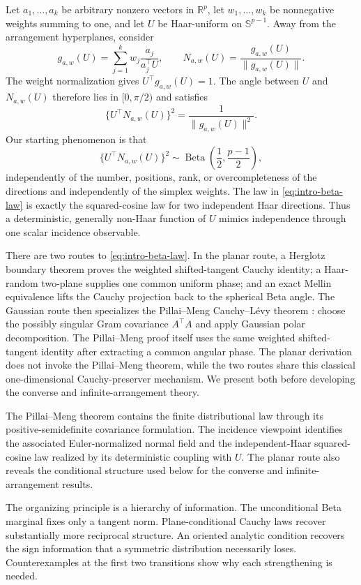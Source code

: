 \documentclass[11pt]{article}
\numberwithin{equation}{section}
\theoremstyle{thmstyleone}%
\theoremstyle{thmstyletwo}%
\let\cref\autoref
\newcommand{\R}{\mathbb R}
\newcommand{\sphere}{\mathbb S}
\newcommand{\Beta}{\operatorname{Beta}}
\begin{document}
Let \(a_1,\ldots,a_k\) be arbitrary nonzero vectors in \(\R^p\), let
\(w_1,\ldots,w_k\) be nonnegative weights summing to one, and let
\(U\) be Haar-uniform on \(\sphere^{p-1}\).  Away from the arrangement
hyperplanes, consider
\[
  g_{a,w}(U)=\sum_{j=1}^k w_j\frac{a_j}{a_j^\top U},
  \qquad
  N_{a,w}(U)=\frac{g_{a,w}(U)}{\|g_{a,w}(U)\|}.
\]
The weight normalization gives \(U^\top g_{a,w}(U)=1\).  The angle between \(U\)
and \(N_{a,w}(U)\) therefore lies in \([0,\pi/2)\) and satisfies
\[
  \{U^\top N_{a,w}(U)\}^2=\frac{1}{\|g_{a,w}(U)\|^2}.
\]
Our starting phenomenon is that
\begin{equation}
  \{U^\top N_{a,w}(U)\}^2
  \sim
  \Beta\!\left(\frac12,\frac{p-1}{2}\right),
  \label{eq:intro-beta-law}
\end{equation}
independently of the number, positions, rank, or overcompleteness of the
directions and independently of the simplex weights.  The law in
\cref{eq:intro-beta-law} is exactly the squared-cosine law for two independent
Haar directions.  Thus a deterministic, generally non-Haar function of
\(U\) mimics independence through one scalar incidence observable.

There are two routes to \cref{eq:intro-beta-law}.  In the planar route, a
Herglotz boundary theorem proves the
weighted shifted-tangent Cauchy identity; a Haar-random two-plane supplies
one common uniform phase; and an exact Mellin equivalence lifts the Cauchy
projection back to the spherical Beta angle.  The Gaussian route then
specializes the Pillai--Meng Cauchy--L\'evy theorem
\cite{pillai-meng-2016}: choose the possibly singular Gram covariance
\(A^\top A\) and apply Gaussian polar decomposition.  The Pillai--Meng proof
itself uses the same weighted shifted-tangent identity after extracting a
common angular phase.  The planar derivation does not invoke the
Pillai--Meng theorem, while the two routes share this classical
one-dimensional Cauchy-preserver mechanism.  We present both before
developing the converse and infinite-arrangement theory.

The Pillai--Meng theorem contains the finite distributional law through its
positive-semidefinite covariance formulation.  The incidence viewpoint
identifies the associated Euler-normalized normal field and the
independent-Haar squared-cosine law realized by its deterministic coupling
with \(U\).  The planar route also reveals the conditional structure used
below for the converse and infinite-arrangement results.

The organizing principle is a hierarchy of information.  The unconditional
Beta marginal fixes only a tangent norm.  Plane-conditional Cauchy laws
recover substantially more reciprocal structure.  An oriented analytic
condition recovers the sign information that a symmetric distribution
necessarily loses.  Counterexamples at the first two transitions show why
each strengthening is needed.
\end{document}
